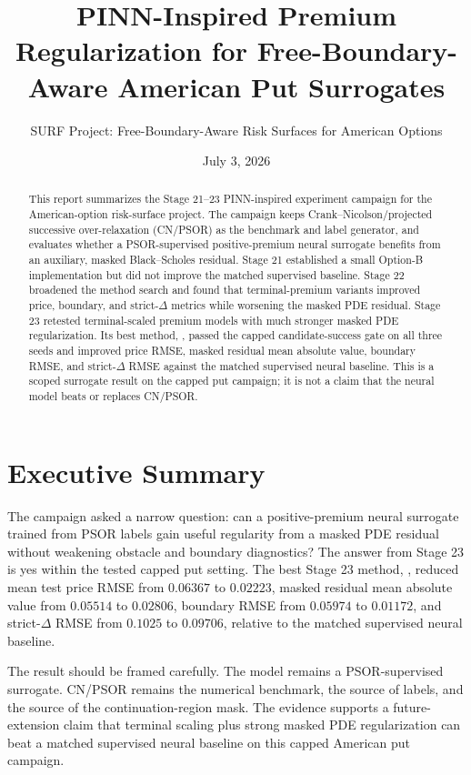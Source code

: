 \documentclass[11pt]{article}
\title{PINN-Inspired Premium Regularization for Free-Boundary-Aware American Put Surrogates}
\author{SURF Project: Free-Boundary-Aware Risk Surfaces for American Options}
\date{July 3, 2026}
\begin{document}
\maketitle

\begin{abstract}
This report summarizes the Stage 21--23 PINN-inspired experiment campaign for the American-option risk-surface project. The campaign keeps Crank--Nicolson/projected successive over-relaxation (CN/PSOR) as the benchmark and label generator, and evaluates whether a PSOR-supervised positive-premium neural surrogate benefits from an auxiliary, masked Black--Scholes residual. Stage 21 established a small Option-B implementation but did not improve the matched supervised baseline. Stage 22 broadened the method search and found that terminal-premium variants improved price, boundary, and strict-\(\Delta\) metrics while worsening the masked PDE residual. Stage 23 retested terminal-scaled premium models with much stronger masked PDE regularization. Its best method, , passed the capped candidate-success gate on all three seeds and improved price RMSE, masked residual mean absolute value, boundary RMSE, and strict-\(\Delta\) RMSE against the matched supervised neural baseline. This is a scoped surrogate result on the capped put campaign; it is not a claim that the neural model beats or replaces CN/PSOR.
\end{abstract}

\section{Executive Summary}

The campaign asked a narrow question: can a positive-premium neural surrogate trained from PSOR labels gain useful regularity from a masked PDE residual without weakening obstacle and boundary diagnostics? The answer from Stage 23 is yes within the tested capped put setting. The best Stage 23 method, , reduced mean test price RMSE from \(0.06367\) to \(0.02223\), masked residual mean absolute value from \(0.05514\) to \(0.02806\), boundary RMSE from \(0.05974\) to \(0.01172\), and strict-\(\Delta\) RMSE from \(0.1025\) to \(0.09706\), relative to the matched supervised neural baseline.

The result should be framed carefully. The model remains a PSOR-supervised surrogate. CN/PSOR remains the numerical benchmark, the source of labels, and the source of the continuation-region mask. The evidence supports a future-extension claim that terminal scaling plus strong masked PDE regularization can beat a matched supervised neural baseline on this capped American put campaign.
\end{document}
